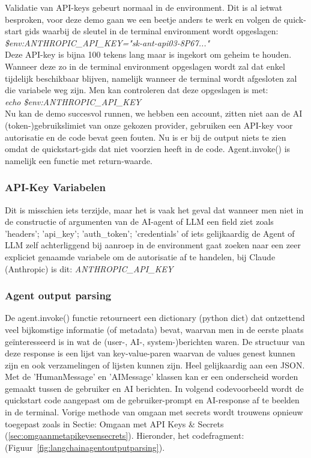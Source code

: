 Validatie van API-keys gebeurt normaal in de environment. Dit is al ietwat besproken, voor deze demo gaan we een beetje anders te werk en volgen de quick-start gids waarbij de sleutel in de terminal environment wordt opgeslagen: \\
\textit{\$env:ANTHROPIC\_API\_KEY="sk-ant-api03-8P67..."} \\

Deze API-key is bijna 100 tekens lang maar is ingekort om geheim te houden. Wanneer deze zo in de terminal environment opgeslagen wordt zal dat enkel tijdelijk beschikbaar blijven, namelijk wanneer de terminal wordt afgesloten zal die variabele weg zijn. Men kan controleren dat deze opgeslagen is met:\\ \textit{echo \$env:ANTHROPIC\_API\_KEY} \\

Nu kan de demo succesvol runnen, we hebben een account, zitten niet aan de AI (token-)gebruikslimiet van onze gekozen provider, gebruiken een API-key voor autorisatie en de code bevat geen fouten. Nu is er bij de output niets te zien omdat de quickstart-gids dat niet voorzien heeft in de code. Agent.invoke() is namelijk een functie met return-waarde.  \\

\subsubsection{API-Key Variabelen}
\label{sssec:apikeyvariabelen}
Dit is misschien iets terzijde, maar het is vaak het geval dat wanneer men niet in de constructie of argumenten van de AI-agent of LLM een field ziet zoals 'headers'; 'api\_key'; 'auth\_token'; 'credentials' of iets gelijkaardig de Agent of LLM zelf achterliggend bij aanroep in de environment gaat zoeken naar een zeer expliciet genaamde variabele om de autorisatie af te handelen, bij Claude (Anthropic) is dit: \textit{ANTHROPIC\_API\_KEY}

\subsubsection{Agent output parsing}
\label{sssec:agentoutputparsing}
De agent.invoke() functie retourneert een dictionary (python dict) dat ontzettend veel bijkomstige informatie (of metadata) bevat, waarvan men in de eerste plaats geïnteresseerd is in wat de (user-, AI-, system-)berichten waren. De structuur van deze response is een lijst van key-value-paren waarvan de values genest kunnen zijn en ook verzamelingen of lijsten kunnen zijn. Heel gelijkaardig aan een JSON. Met de 'HumanMessage' en 'AIMessage' klassen kan er een onderscheid worden gemaakt tussen de gebruiker en AI berichten. In volgend codevoorbeeld wordt de quickstart code aangepast om de gebruiker-prompt en AI-response af te beelden in de terminal. Vorige methode van omgaan met secrets wordt trouwens opnieuw toegepast zoals in Sectie: Omgaan met API Keys \& Secrets (\ref{sec:omgaanmetapikeysensecrets}). Hieronder, het codefragment: (Figuur~\ref{fig:langchainagentoutputparsing}). \\


